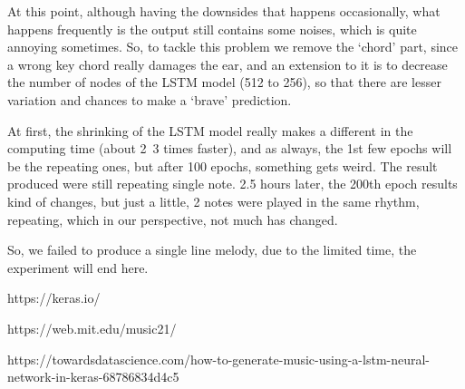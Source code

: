 \documentclass[10pt,twocolumn,letterpaper]{article}
\begin{document}
At this point, although having the downsides that happens occasionally, what happens frequently is the output still contains some noises, which is quite annoying sometimes. So, to tackle this problem we remove the ‘chord’ part, since a wrong key chord really damages the ear, and an extension to it is to decrease the number of nodes of the LSTM model (512 to 256), so that there are lesser variation and chances to make a ‘brave’ prediction.

At first, the shrinking of the LSTM model really makes a different in the computing time (about 2~3 times faster), and as always, the 1st few epochs will be the repeating ones, but after 100 epochs, something gets weird. The result produced were still repeating single note. 2.5 hours later, the 200th epoch results kind of changes, but just a little, 2 notes were played in the same rhythm, repeating, which in our perspective, not much has changed.

So, we failed to produce a single line melody, due to the limited time, the experiment will end here.


{\small


}
https://keras.io/

https://web.mit.edu/music21/

https://towardsdatascience.com/how-to-generate-music-using-a-lstm-neural-network-in-keras-68786834d4c5
\end{document}
